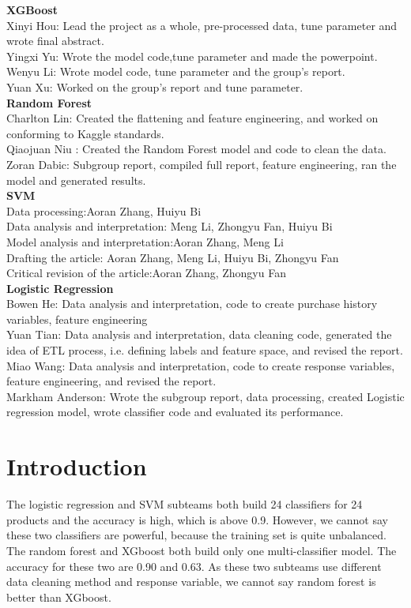 \documentclass{article}
\begin{document}
\begin{spacing}{1}
\begin{large}
\begin{multicols}{2}
\textbf{XGBoost} \\
Xinyi Hou: Lead the project as a whole, pre-processed data, tune parameter and wrote final abstract. \\
Yingxi Yu:  Wrote the model code,tune parameter and made the powerpoint. \\
Wenyu Li: Wrote model code, tune parameter and the group's report. \\
Yuan Xu:  Worked on the group's report and tune parameter. \\
\textbf{Random Forest} \\
Charlton Lin: Created the flattening and feature engineering, and worked on conforming to Kaggle standards. \\
Qiaojuan Niu : Created the Random Forest model and code to clean the data. \\
Zoran Dabic: Subgroup report, compiled full report, feature engineering, ran the model and generated results. \\
\textbf{SVM} \\
Data processing:Aoran Zhang, Huiyu Bi \\
Data analysis and interpretation: Meng Li, Zhongyu Fan, Huiyu Bi \\
Model analysis and interpretation:Aoran Zhang, Meng Li \\
Drafting the article: Aoran Zhang, Meng Li, Huiyu Bi, Zhongyu Fan \\
Critical revision of the article:Aoran Zhang, Zhongyu Fan \\
\textbf{Logistic Regression} \\
Bowen He:  Data analysis and interpretation, code to create purchase history variables, feature engineering\\
Yuan Tian:  Data analysis and interpretation, data cleaning code, generated the idea of ETL process, i.e. defining labels and feature space, and revised the report. \\
Miao Wang:  Data analysis and interpretation, code to create response variables, feature engineering, and revised the report. \\
Markham Anderson: Wrote the subgroup report, data processing, created Logistic regression model, wrote classifier code and evaluated its performance. \\

\end{multicols}

\newpage

\section{Introduction}
The logistic regression and SVM subteams both build 24 classifiers for 24 products and the accuracy is high, which is above 0.9. However, we cannot say these two classifiers are powerful, because the training set is quite unbalanced. The random forest and XGboost both build only one multi-classifier model. The accuracy for these two are 0.90 and 0.63. As these two subteams use different data cleaning method and response variable, we cannot say random forest is better than XGboost.



\end{large}
\end{spacing}
\end{document}
